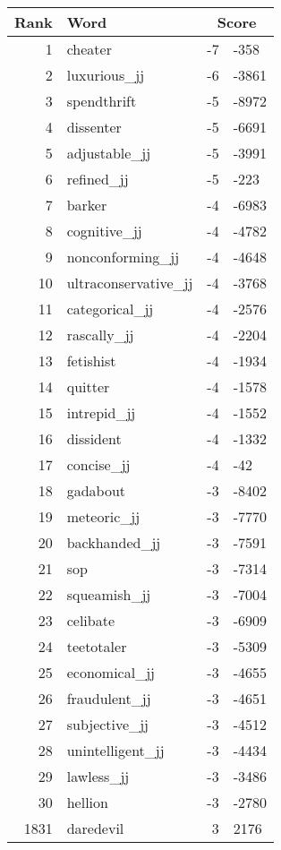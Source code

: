 \begin{longtable}[!htbp]{| rlr@{.}l |}
    \hline
    \textbf{Rank} & \textbf{Word} & \multicolumn{2}{c|}{\textbf{Score}} \\
    \hline
    \endhead
    1 & cheater & -7 & -358 \\
    2 & luxurious\_jj & -6 & -3861 \\
    3 & spendthrift & -5 & -8972 \\
    4 & dissenter & -5 & -6691 \\
    5 & adjustable\_jj & -5 & -3991 \\
    6 & refined\_jj & -5 & -223 \\
    7 & barker & -4 & -6983 \\
    8 & cognitive\_jj & -4 & -4782 \\
    9 & nonconforming\_jj & -4 & -4648 \\
    10 & ultraconservative\_jj & -4 & -3768 \\
    11 & categorical\_jj & -4 & -2576 \\
    12 & rascally\_jj & -4 & -2204 \\
    13 & fetishist & -4 & -1934 \\
    14 & quitter & -4 & -1578 \\
    15 & intrepid\_jj & -4 & -1552 \\
    16 & dissident & -4 & -1332 \\
    17 & concise\_jj & -4 & -42 \\
    18 & gadabout & -3 & -8402 \\
    19 & meteoric\_jj & -3 & -7770 \\
    20 & backhanded\_jj & -3 & -7591 \\
    21 & sop & -3 & -7314 \\
    22 & squeamish\_jj & -3 & -7004 \\
    23 & celibate & -3 & -6909 \\
    24 & teetotaler & -3 & -5309 \\
    25 & economical\_jj & -3 & -4655 \\
    26 & fraudulent\_jj & -3 & -4651 \\
    27 & subjective\_jj & -3 & -4512 \\
    28 & unintelligent\_jj & -3 & -4434 \\
    29 & lawless\_jj & -3 & -3486 \\
    30 & hellion & -3 & -2780 \\
    1831 & daredevil & 3 & 2176 \\

\end{longtable}
